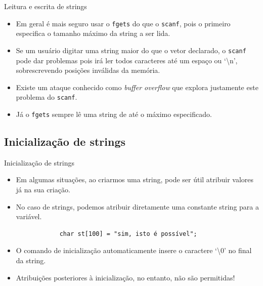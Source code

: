 \documentclass[handout]{beamer}
\newcommand{\cod}[1]{\texttt{#1}}
\begin{document}
\begin{frame}[fragile]{Leitura e escrita de strings}

    \begin{itemize}[<+->]
        \item Em geral é mais seguro usar o \cod{fgets} do que o \cod{scanf}, pois o primeiro especifica o tamanho máximo da string a ser lida.
        \item Se um usuário digitar uma string maior do que o vetor declarado, o \cod{scanf} pode dar problemas pois irá ler todos caracteres até um espaço ou `\textbackslash n', sobrescrevendo posições inválidas da memória.
        \item Existe um ataque conhecido como {\it buffer overflow} que explora justamente este problema do \cod{scanf}.
        \item Já o \cod{fgets} sempre lê uma string de até o máximo especificado.
    \end{itemize}

\end{frame}


\subsection{Inicialização de strings}

\begin{frame}[fragile]{Inicialização de strings}

    \begin{itemize}[<+->]
        \item Em algumas situações, ao criarmos uma string, pode ser útil atribuir valores já na sua criação.
        \item No caso de strings, podemos atribuir diretamente uma constante string para a variável.

        \begin{verbatim}
            char st[100] = "sim, isto é possível";
        \end{verbatim}

        \item O comando de inicialização automaticamente insere o caractere `\textbackslash{0}' no final da string.
        \item Atribuições posteriores à inicialização, no entanto, não são permitidas!
    \end{itemize}

\end{frame}
\end{document}
